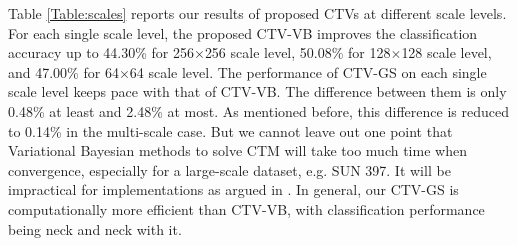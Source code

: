 \documentclass[journal]{IEEEtran}
\begin{document}
%

Table \ref{Table:scales} reports our results of proposed CTVs at different scale levels. For each single scale level, the proposed CTV-VB improves the classification accuracy up to 44.30\% for 256$\times$256 scale level, 50.08\% for 128$\times$128 scale level, and 47.00\% for 64$\times$64 scale level. The performance of CTV-GS on each single scale level keeps pace with that of CTV-VB. The difference between them is only 0.48\% at least and 2.48\% at most. As mentioned before, this difference is reduced to 0.14\% in the multi-scale case. But we cannot leave out one point that Variational Bayesian methods to solve CTM will take too much time when convergence, especially for a large-scale dataset, e.g. SUN 397. It will be impractical for implementations as argued in \cite{chen2013scalable}. In general, our CTV-GS is computationally more efficient than CTV-VB, with classification performance being neck and neck with it.
\end{document}
